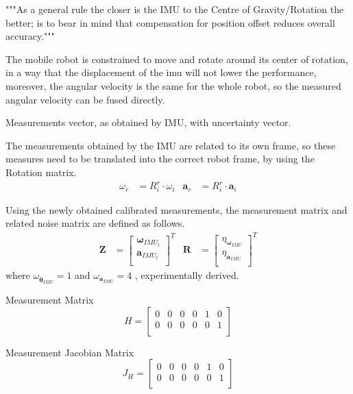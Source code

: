 """As a general rule the closer is the IMU to the Centre of Gravity/Rotation the better; is to bear in mind that compensation for position offset reduces overall accuracy."""

The mobile robot is constrained to move and rotate around its center of rotation, in a way that the displacement of the imu will not lower the performance, moreover, the angular velocity is the same for the whole robot, so the measured angular velocity can be fused directly.


Measurements vector, as obtained by IMU, with uncertainty vector.

The measurements obtained by the IMU are related to its own frame, so these measures need to be translated into the correct robot frame, by using the Rotation matrix.
\begin{align}
	\omega_r &= R_i^r \cdot \omega_i & \mathbf{a}_r &= R_i^r \cdot \mathbf{a}_i
\end{align}

Using the newly obtained calibrated measurements, the measurement matrix and related noise matrix are defined as follows.
\begin{align}
\mathbf{Z}
&=
\begin{bmatrix}
\boldsymbol \omega_{IMU_t} \\
\mathbf{a}_{IMU_t} \\
\end{bmatrix}^T
& 
\mathbf{R}
&=
\begin{bmatrix}
\eta_{\boldsymbol \omega_{IMU}} \\
\eta_{\mathbf{a}_{IMU}} \\
\end{bmatrix}^T
\end{align}
where $ \omega_{\dot{\boldsymbol \theta}_{IMU}} = 1$ and
$ \omega_{\mathbf{a}_{IMU}} = 4 $ , experimentally derived.


Measurement Matrix
\begin{equation}
H
=
\begin{bmatrix}
0 & 0 & 0 & 0 & 1 & 0 \\
0 & 0 & 0 & 0 & 0 & 1 \\
\end{bmatrix}
\end{equation}

Measurement Jacobian Matrix
\begin{equation}
J_H
=
\begin{bmatrix}
0 & 0 & 0 & 0 & 1 & 0 \\
0 & 0 & 0 & 0 & 0 & 1 \\
\end{bmatrix}
\end{equation}

